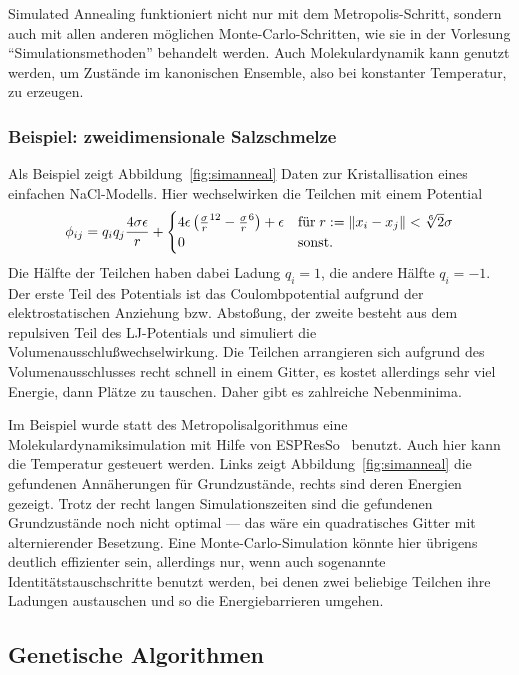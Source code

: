 Simulated Annealing funktioniert nicht nur mit dem
Metropolis-Schritt, sondern auch mit allen anderen möglichen
Monte-Carlo-Schritten, wie sie in der Vorlesung
"`Simulationsmethoden"' behandelt werden. Auch Molekulardynamik kann
genutzt werden, um Zustände im kanonischen Ensemble, also bei
konstanter Temperatur, zu erzeugen.

\subsubsection{Beispiel: zweidimensionale Salzschmelze}
Als Beispiel zeigt Abbildung~\ref{fig:simanneal} Daten zur
Kristallisation eines einfachen NaCl-Modells. Hier wechselwirken die
Teilchen mit einem Potential
\begin{equation}
  \phi_{ij} = q_iq_j\frac{4\sigma\epsilon}{r}  +
  \begin{cases}
    4\epsilon\left(\frac{\sigma}{r}^{12} -
      \frac{\sigma}{r}^{6}\right) + \epsilon
    & \text{für}\; r:= \left\lVert{x_i-x_j}\right\rVert < \sqrt[6]{2}\sigma\\
    0 & \text{sonst}.
  \end{cases}
\end{equation}
Die Hälfte der Teilchen haben dabei Ladung $q_i=1$, die andere Hälfte
$q_i=-1$. Der erste Teil des Potentials ist das Coulombpotential
aufgrund der elektrostatischen Anziehung bzw. Abstoßung, der zweite
besteht aus dem repulsiven Teil des LJ-Potentials und simuliert die
Volumenausschlußwechselwirkung. Die Teilchen arrangieren sich aufgrund
des Volumenausschlusses recht schnell in einem Gitter, es kostet
allerdings sehr viel Energie, dann Plätze zu tauschen. Daher gibt es
zahlreiche Nebenminima.

Im Beispiel wurde statt des Metropolisalgorithmus eine
Molekulardynamiksimulation mit Hilfe von ESPResSo~\cite{espresso}
benutzt. Auch hier kann die Temperatur gesteuert werden. Links zeigt
Abbildung~\ref{fig:simanneal} die gefundenen Annäherungen für
Grundzustände, rechts sind deren Energien gezeigt. Trotz der recht
langen Simulationszeiten sind die gefundenen Grundzustände noch nicht
optimal --- das wäre ein quadratisches Gitter mit alternierender
Besetzung. Eine Monte-Carlo-Simulation könnte hier übrigens deutlich
effizienter sein, allerdings nur, wenn auch sogenannte
Identitätstauschschritte benutzt werden, bei denen zwei beliebige
Teilchen ihre Ladungen austauschen und so die Energiebarrieren
umgehen.

\subsection{Genetische Algorithmen}

